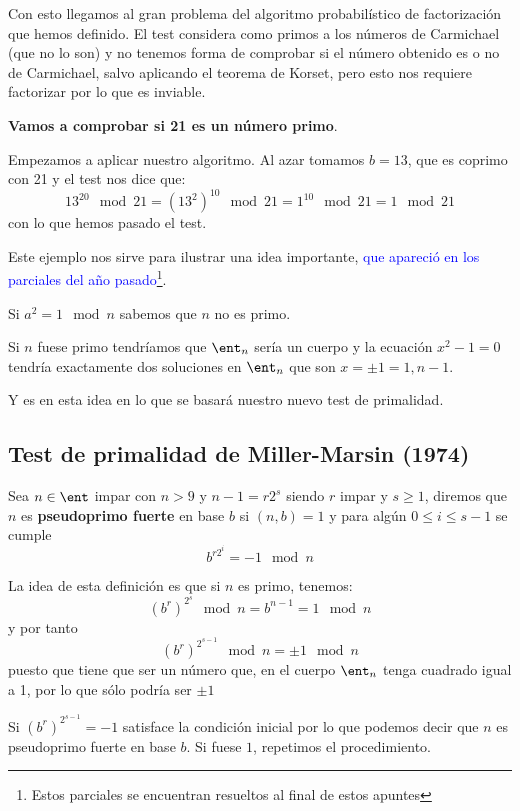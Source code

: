 Con esto llegamos al gran problema del algoritmo probabilístico de factorización que hemos definido. El test considera como primos a los números de Carmichael (que no lo son) y no tenemos forma de comprobar si el número obtenido es o no de Carmichael, salvo aplicando el teorema de Korset, pero esto nos requiere factorizar por lo que es inviable.

\begin{example}
\textbf{Vamos a comprobar si 21 es un número primo}.

Empezamos a aplicar nuestro algoritmo. Al azar tomamos $b=13$, que es coprimo con 21 y el test nos dice que:
\[13^{20} \mod 21 = (13^2)^{10} \mod 21 =1^{10} \mod 21 =1 \mod 21\]
con lo que hemos pasado el test.
\end{example}

Este ejemplo nos sirve para ilustrar una idea importante, \textcolor{blue}{que apareció en los parciales del año pasado\footnote{Estos parciales se encuentran resueltos al final de estos apuntes}}. 

\begin{mdframed}
Si $a^2 = 1 \mod n$ sabemos que $n$ no es primo.
\end{mdframed}

Si $n$ fuese primo tendríamos que $\ent_{n}$ sería un cuerpo y la ecuación $x^2-1 = 0 $ tendría exactamente dos soluciones en $\ent_{n}$ que son $x=\pm 1 = 1, n-1$.

Y es en esta idea en lo que se basará nuestro nuevo test de primalidad.

\subsection{Test de primalidad de Miller-Marsin (1974)}
\begin{defn}
Sea $n \in \ent$ impar con $n>9$ y $n-1=r2^s$ siendo $r$ impar y $s \geq 1$, diremos que $n$ es \textbf{pseudoprimo fuerte} en base $b$ si $(n,b)=1$ y para algún $0 \leq i \leq s-1$ se cumple
\[b^{r2^i}=-1\mod n\]
\end{defn}

La idea de esta definición es que si $n$ es primo, tenemos:
\[(b^r)^{2^s} \mod n=b^{n-1} = 1 \mod n\]
y por tanto
\[(b^r)^{2^{s-1}} \mod n = \pm 1 \mod n\]
puesto que tiene que ser un número que, en el cuerpo $\ent_n$ tenga cuadrado igual a 1, por lo que sólo podría ser $\pm 1$

Si $(b^r)^{2^{s-1}}=-1$ satisface la condición inicial por lo que podemos decir que $n$ es pseudoprimo fuerte en base $b$. Si fuese $1$, repetimos el procedimiento.

